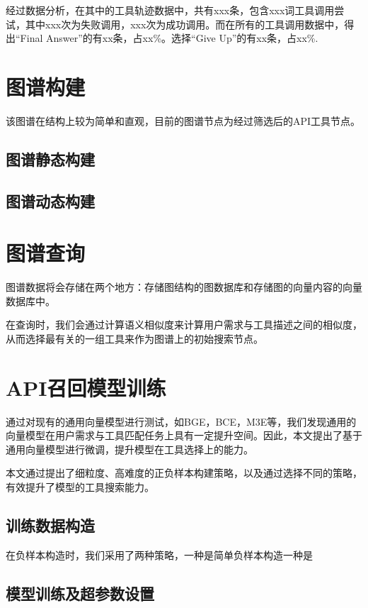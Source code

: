 经过数据分析，在其中的工具轨迹数据中，共有xxx条，包含xxx词工具调用尝试，其中xxx次为失败调用，xxx次为成功调用。而在所有的工具调用数据中，得出“Final Answer”的有xx条，占xx\%。选择“Give Up”的有xx条，占xx\%.

\section{图谱构建}

该图谱在结构上较为简单和直观，目前的图谱节点为经过筛选后的API工具节点。

\subsection{图谱静态构建}

\subsection{图谱动态构建}



\section{图谱查询}

图谱数据将会存储在两个地方：存储图结构的图数据库和存储图的向量内容的向量数据库中。

在查询时，我们会通过计算语义相似度来计算用户需求与工具描述之间的相似度，从而选择最有关的一组工具来作为图谱上的初始搜索节点。

\section{API召回模型训练}

通过对现有的通用向量模型进行测试，如BGE，BCE，M3E等，我们发现通用的向量模型在用户需求与工具匹配任务上具有一定提升空间。因此，本文提出了基于通用向量模型进行微调，提升模型在工具选择上的能力。

本文通过提出了细粒度、高难度的正负样本构建策略，以及通过选择不同的策略，有效提升了模型的工具搜索能力。

\subsection{训练数据构造}


在负样本构造时，我们采用了两种策略，一种是简单负样本构造一种是


\subsection{模型训练及超参数设置}

